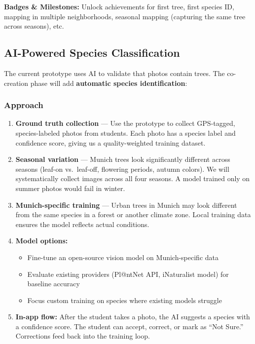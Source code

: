 \documentclass[11pt,a4paper]{article}
\begin{document}
\textbf{Badges \& Milestones:} Unlock achievements for first tree, first species ID, mapping in multiple neighborhoods, seasonal mapping (capturing the same tree across seasons), etc.

\subsection{AI-Powered Species Classification}
\label{sec:ai-species}

The current prototype uses AI to validate that photos contain trees. The co-creation phase will add \textbf{automatic species identification}:

\subsubsection{Approach}
\begin{enumerate}[nosep]
  \item \textbf{Ground truth collection} --- Use the prototype to collect GPS-tagged, species-labeled photos from students. Each photo has a species label and confidence score, giving us a quality-weighted training dataset.
  \item \textbf{Seasonal variation} --- Munich trees look significantly different across seasons (leaf-on vs.\ leaf-off, flowering periods, autumn colors). We will systematically collect images across all four seasons. A model trained only on summer photos would fail in winter.
  \item \textbf{Munich-specific training} --- Urban trees in Munich may look different from the same species in a forest or another climate zone. Local training data ensures the model reflects actual conditions.
  \item \textbf{Model options:}
  \begin{itemize}[nosep]
    \item Fine-tune an open-source vision model on Munich-specific data
    \item Evaluate existing providers (Pl@ntNet API, iNaturalist model) for baseline accuracy
    \item Focus custom training on species where existing models struggle
  \end{itemize}
  \item \textbf{In-app flow:} After the student takes a photo, the AI suggests a species with a confidence score. The student can accept, correct, or mark as ``Not Sure.'' Corrections feed back into the training loop.
\end{enumerate}
\end{document}
